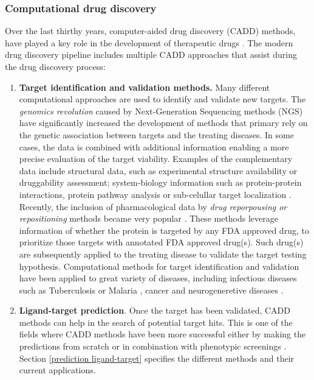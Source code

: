 \documentclass[11pt, b5paper,twoside]{tesi_upf}
\begin{document}
{\begin{figure}[htbp]
	\vspace*{4mm}
\end{figure}

\subsubsection{Computational drug discovery}\label{computational drug discovery}

\par Over the last thirthy years, computer-aided drug discovery (CADD) methods, have played a key role in the development of therapeutic drugs \cite{Sliwoski2014}. The modern drug discovery pipeline includes multiple CADD approaches that assist during the drug discovery process:

\begin{enumerate}

\item \textbf{Target identification and validation methods.} Many different computational approaches are used to identify and validate new targets. The \textit{genomics revolution} caused by Next-Generation Sequencing methods (NGS) have significantly increased the development of methods that primary rely on the genetic association between targets and the treating diseases. In some cases, the data is combined with additional information enabling a more precise evaluation of the target viability. Examples of the complementary data include structural data,  
such as experimental structure availability or druggability assessment; system-biology information such as protein-protein interactions, protein pathway analysis or sub-celullar target localization \cite{Yang2009}. Recently, the inclusion of pharmacological data by \textit{drug reporpousing or repositioning} methods became very popular \cite{Gottlieb2011, Zhang2011, YutakaFukuoka2013}. These methods leverage information of whether the protein is targeted by any FDA approved drug, to prioritize those targets with annotated FDA approved drug(s). Such drug(s) are subsequently applied to the treating disease to validate the target testing hypothesis. Computational methods for target identification and validation have been applied to great variety of diseases, including infectious diseases such as Tuberculosis \cite{Raman2008} or Malaria \cite{Phaiphinit2016}, cancer \cite{Jeon2014} and neurogeneretive diseases \cite{Augustin2012}. 

\item \textbf{Ligand-target prediction}. Once the target has been validated, CADD methods can help in the search of potential target hits. This is one of the fields where CADD methods have been more successful either by making the predictions from scratch or in combination with phenotypic screenings \cite{Martinez-Jimenez2013}. Section \ref{prediction ligand-target} specifies the different methods and their current applications.   


\end{enumerate}}
\end{document}

